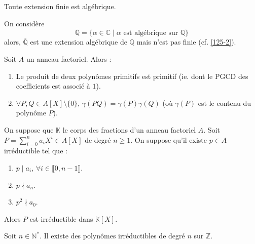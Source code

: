   \begin{proposition}
    Toute extension finie est algébrique.
  \end{proposition}

  \begin{cexample}
    \label{125-1}
    On considère
    \[ \overline{\mathbb{Q}} = \{ \alpha \in \mathbb{C} \mid \alpha \text{ est algébrique sur } \mathbb{Q} \} \]
    alors, $\overline{\mathbb{Q}}$ est une extension algébrique de $\mathbb{Q}$ mais n'est pas finie (cf. \cref{125-2}).
  \end{cexample}


  \begin{lemma}
    Soit $A$ un anneau factoriel. Alors :
    \begin{enumerate}[label={\bfseries(\roman*)}]
      \item Le produit de deux polynômes primitifs est primitif (ie. dont le PGCD des coefficients est associé à $1$).
      \item $\forall P, Q \in A[X] \setminus \{ 0 \}$, $\gamma(PQ) = \gamma(P) \gamma(Q)$ (où $\gamma(P)$ est le contenu du polynôme $P$).
    \end{enumerate}
  \end{lemma}


  \begin{theorem}
    On suppose que $\mathbb{K}$ le corps des fractions d'un anneau factoriel $A$. Soit $P = \sum_{i=0}^n a_i X^i \in A[X]$ de degré $n \geq 1$. On suppose qu'il existe $p \in A$ irréductible tel que :
    \begin{enumerate}[label={\bfseries(\roman*)}]
      \item $p \mid a_i$, $\forall i \in \llbracket 0, n-1 \rrbracket$.
      \item $p \nmid a_n$.
      \item $p^2 \nmid a_0$.
    \end{enumerate}
    Alors $P$ est irréductible dans $\mathbb{K}[X]$.
  \end{theorem}


  \begin{application}
    \label{125-2}
    Soit $n \in \mathbb{N}^*$. Il existe des polynômes irréductibles de degré $n$ sur $\mathbb{Z}$.
  \end{application}

